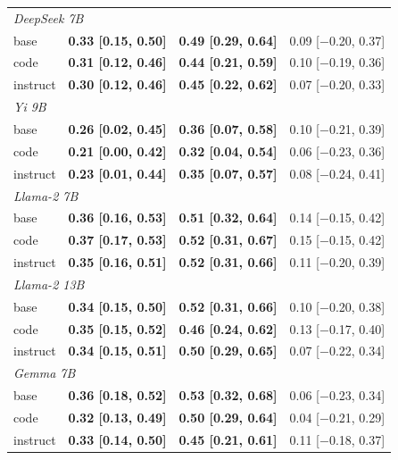\begin{tabular}{llll}
\midrule
\multicolumn{4}{l}{\textit{DeepSeek 7B}} \\
\quad base & \textbf{0.33 [0.15, 0.50]} & \textbf{0.49 [0.29, 0.64]} & 0.09 [$-$0.20, 0.37] \\
\quad code & \textbf{0.31 [0.12, 0.46]} & \textbf{0.44 [0.21, 0.59]} & 0.10 [$-$0.19, 0.36] \\
\quad instruct & \textbf{0.30 [0.12, 0.46]} & \textbf{0.45 [0.22, 0.62]} & 0.07 [$-$0.20, 0.33] \\
\midrule
\multicolumn{4}{l}{\textit{Yi 9B}} \\
\quad base & \textbf{0.26 [0.02, 0.45]} & \textbf{0.36 [0.07, 0.58]} & 0.10 [$-$0.21, 0.39] \\
\quad code & \textbf{0.21 [0.00, 0.42]} & \textbf{0.32 [0.04, 0.54]} & 0.06 [$-$0.23, 0.36] \\
\quad instruct & \textbf{0.23 [0.01, 0.44]} & \textbf{0.35 [0.07, 0.57]} & 0.08 [$-$0.24, 0.41] \\
\midrule
\multicolumn{4}{l}{\textit{Llama-2 7B}} \\
\quad base & \textbf{0.36 [0.16, 0.53]} & \textbf{0.51 [0.32, 0.64]} & 0.14 [$-$0.15, 0.42] \\
\quad code & \textbf{0.37 [0.17, 0.53]} & \textbf{0.52 [0.31, 0.67]} & 0.15 [$-$0.15, 0.42] \\
\quad instruct & \textbf{0.35 [0.16, 0.51]} & \textbf{0.52 [0.31, 0.66]} & 0.11 [$-$0.20, 0.39] \\
\midrule
\multicolumn{4}{l}{\textit{Llama-2 13B}} \\
\quad base & \textbf{0.34 [0.15, 0.50]} & \textbf{0.52 [0.31, 0.66]} & 0.10 [$-$0.20, 0.38] \\
\quad code & \textbf{0.35 [0.15, 0.52]} & \textbf{0.46 [0.24, 0.62]} & 0.13 [$-$0.17, 0.40] \\
\quad instruct & \textbf{0.34 [0.15, 0.51]} & \textbf{0.50 [0.29, 0.65]} & 0.07 [$-$0.22, 0.34] \\
\midrule
\multicolumn{4}{l}{\textit{Gemma 7B}} \\
\quad base & \textbf{0.36 [0.18, 0.52]} & \textbf{0.53 [0.32, 0.68]} & 0.06 [$-$0.23, 0.34] \\
\quad code & \textbf{0.32 [0.13, 0.49]} & \textbf{0.50 [0.29, 0.64]} & 0.04 [$-$0.21, 0.29] \\
\quad instruct & \textbf{0.33 [0.14, 0.50]} & \textbf{0.45 [0.21, 0.61]} & 0.11 [$-$0.18, 0.37] \\
\bottomrule
\end{tabular}
